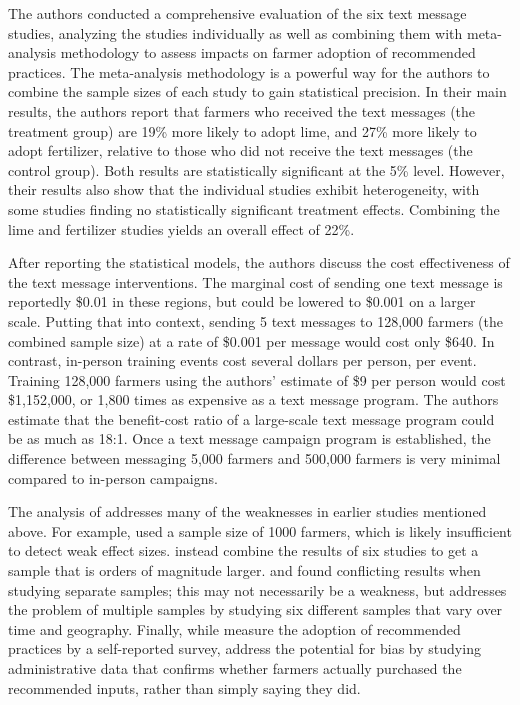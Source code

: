 \documentclass[12pt]{article}
\begin{document}
The authors conducted a comprehensive evaluation of the six text message studies, analyzing the studies individually as well as combining them with meta-analysis methodology to assess impacts on farmer adoption of recommended practices. The meta-analysis methodology is a powerful way for the authors to combine the sample sizes of each study to gain statistical precision. In their main results, the authors report that farmers who received the text messages (the treatment group) are 19\% more likely to adopt lime, and 27\% more likely to adopt fertilizer, relative to those who did not receive the text messages (the control group). Both results are statistically significant at the 5\% level. However, their results also show that the individual studies exhibit heterogeneity, with some studies finding no statistically significant treatment effects. Combining the lime and fertilizer studies yields an overall effect of 22\%.

After reporting the statistical models, the authors discuss the cost effectiveness of the text message interventions. The marginal cost of sending one text message is reportedly \$0.01 in these regions, but could be lowered to \$0.001 on a larger scale. Putting that into context, sending 5 text messages to 128,000 farmers (the combined sample size) at a rate of \$0.001 per message would cost only \$640. In contrast, in-person training events cost several dollars per person, per event. Training 128,000 farmers using the authors' estimate of \$9 per person would cost \$1,152,000, or 1,800 times as expensive as a text message program. The authors estimate that the benefit-cost ratio of a large-scale text message program could be as much as 18:1. Once a text message campaign program is established, the difference between messaging 5,000 farmers and 500,000 farmers is very minimal compared to in-person campaigns.

The analysis of \textcite{fabregas_digital_2025} addresses many of the weaknesses in earlier studies mentioned above. For example, \textcite{fafchamps_impact_2012} used a sample size of 1000 farmers, which is likely insufficient to detect weak effect sizes. \textcite{fabregas_digital_2025} instead combine the results of six studies to get a sample that is orders of magnitude larger. \textcite{casaburi_harnessing_2019} and \textcite{casaburi_management_2016} found conflicting results when studying separate samples; this may not necessarily be a weakness, but \textcite{fabregas_digital_2025} addresses the problem of multiple samples by studying six different samples that vary over time and geography. Finally, while \textcite{carrion-yaguana_promoting_2020} measure the adoption of recommended practices by a self-reported survey, \textcite{fabregas_digital_2025} address the potential for bias by studying administrative data that confirms whether farmers actually purchased the recommended inputs, rather than simply saying they did.
\end{document}
